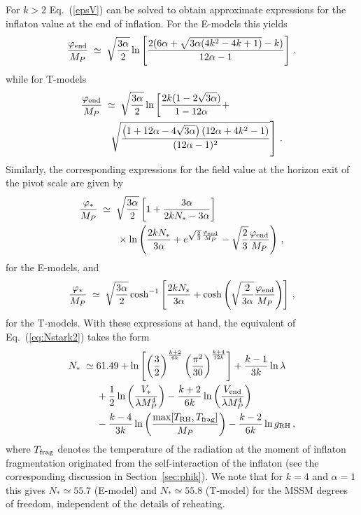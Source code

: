 \documentclass[aps,prev,twocolumn,preprintnumbers,floatfix,nofootinbib]{revtex4-1}
\newcommand{\beq}{\begin{equation}}
\newcommand{\eeq}{\end{equation}}
\begin{document}
For $k>2$ Eq.~(\ref{epsV}) can be solved to obtain approximate expressions for the inflaton value at the end of inflation. For the E-models this yields 
\beq\label{eq:phiendEk}
\frac{\varphi_{\rm end}}{M_P}\;\simeq\; \sqrt{\frac{3\alpha}{2}} \ln\left[\frac{2(6\alpha + \sqrt{3\alpha(4k^2-4k+1)}-k)}{12\alpha-1} \right]\,.
\eeq
while for T-models
\begin{align}\notag
\frac{\varphi_{\rm end}}{M_P}\;&\simeq\; \sqrt{\frac{3\alpha}{2}}  \ln\left[ \frac {2k(1-2\sqrt{3\alpha})} {1 - 12\alpha}   + \right.\\ \label{eq:phiendTk}
&\ \left. \sqrt {\frac {\left (1 + 12\alpha - 4\sqrt{3\alpha} \right)\left (12\alpha + 4 k^2 - 1 \right)} {(12\alpha - 
       1)^2}} \right]\,.
\end{align}
Similarly, the corresponding expressions for the field value at the horizon exit of the pivot scale are given by
\begin{align}
\notag
\frac{\varphi_{*}}{M_P} & \; \simeq \; \sqrt{\frac{3\alpha}{2}}
\left[1 + \frac{3\alpha}{2kN_*-3\alpha} \right] \\
& \qquad \times
\ln\left(\frac{2kN_*}{3\alpha} + e^{\sqrt{\frac{2}{3}} \frac{\varphi_{\rm{end}}}{M_P}} - \sqrt{\frac{2}{3}} \frac{\varphi_{\rm{end}}}{M_P} \right)  \,, 
\end{align}
for the E-models, and 
\beq
\frac{\varphi_{*}}{M_P} \; \simeq \;  \sqrt{\frac{3\alpha}{2}}  \cosh^{-1} \left[\frac{2kN_*}{3\alpha} + \cosh\left(\sqrt{\frac{2}{3\alpha}} \frac{\varphi_{\rm{end}}}{M_P} \right) \right] \, ,
\label{eq:phistarTk}
\eeq
for the T-models. With these expressions at hand, the equivalent of Eq.~(\ref{eq:Nstark2}) takes the form
\begin{align}\notag
N_* \;\simeq\; &61.49 + \ln\left[ \left(\frac{3}{2}\right)^{\frac{k+2}{6k}} \left(\frac{\pi^2}{30}\right)^{\frac{k+4}{12k}} \right] + \frac{k-1}{3k}\ln\lambda\\ \notag
&+ \frac{1}{2} \ln \left( \frac{V_*}{\lambda M_P^4}\right) - \frac{k+2}{6k} \ln \left( \frac{V_{\rm end}}{\lambda M_P^4}\right)\\ \label{eq:Nstarka}
& - \frac{k-4}{3k}\ln\left(\frac{\max[T_{\rm RH},T_{\rm frag}]}{M_P}\right) - \frac{k-2}{6k}\ln g_{\rm RH}\,,
\end{align}
where $T_{\rm frag}$ denotes the temperature of the radiation at the moment of inflaton fragmentation originated from the self-interaction of the inflaton (see the corresponding discussion in Section~\ref{sec:phik}). We note that for $k=4$ and $\alpha=1$ this gives $N_*\simeq 55.7$ (E-model) and $N_*\simeq 55.8$ (T-model) for the MSSM degrees of freedom, independent of the details of reheating.
\end{document}
